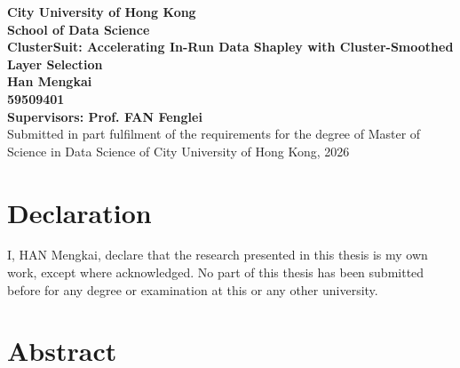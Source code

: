 \documentclass[12pt,a4paper]{report}
\begin{document}
\thispagestyle{empty}
\begin{center}
\vspace*{0.5in}
\textbf{City University of Hong Kong}\\
\textbf{School of Data Science}\\[2in]

{\Large \textbf{ClusterSuit: Accelerating In-Run Data Shapley with Cluster-Smoothed Layer Selection}}\\[1.5in]

\textbf{Han Mengkai}\\
\textbf{59509401}\\[1in]

\textbf{Supervisors: Prof. FAN Fenglei}\\[1.5in]

Submitted in part fulfilment of the requirements for the degree of Master of Science in Data Science of City University of Hong Kong, 2026

\end{center}
\newpage
\thispagestyle{empty}
\quad
\newpage

\thispagestyle{empty}
\section*{Declaration}
\bigskip

I, HAN Mengkai, declare that the research presented in this thesis is my own work, except where acknowledged. No part of this thesis has been submitted before for any degree or examination at this or any other university.

\vfill
\newpage
\thispagestyle{empty}
\quad
\newpage

\thispagestyle{plain}
\section*{Abstract}
\bigskip
\end{document}

